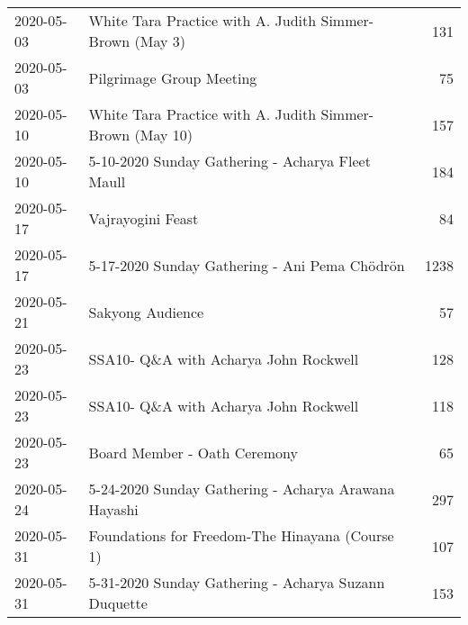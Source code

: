 \documentclass[
]{article}
\newenvironment{Shaded}{\begin{snugshade}}{\end{snugshade}}
\newcommand{\DataTypeTok}[1]{\textcolor[rgb]{0.13,0.29,0.53}{#1}}
\newcommand{\KeywordTok}[1]{\textcolor[rgb]{0.13,0.29,0.53}{\textbf{#1}}}
\newcommand{\NormalTok}[1]{#1}
\newcommand{\OperatorTok}[1]{\textcolor[rgb]{0.81,0.36,0.00}{\textbf{#1}}}
\newcommand{\OtherTok}[1]{\textcolor[rgb]{0.56,0.35,0.01}{#1}}
\newcommand{\StringTok}[1]{\textcolor[rgb]{0.31,0.60,0.02}{#1}}
\begin{document}
\begin{longtable}{llr}
2020-05-03 & White Tara Practice with A. Judith Simmer-Brown (May 3) & 131 \\ 
2020-05-03 & Pilgrimage Group Meeting & 75 \\ 
2020-05-10 & White Tara Practice with A. Judith Simmer-Brown (May 10) & 157 \\ 
2020-05-10 & 5-10-2020 Sunday Gathering - Acharya Fleet Maull & 184 \\ 
2020-05-17 & Vajrayogini Feast & 84 \\ 
2020-05-17 & 5-17-2020 Sunday Gathering - Ani Pema Chödrön & 1238 \\ 
2020-05-21 & Sakyong Audience & 57 \\ 
2020-05-23 & SSA10- Q\&A with Acharya John Rockwell & 128 \\ 
2020-05-23 & SSA10- Q\&A with Acharya John Rockwell & 118 \\ 
2020-05-23 & Board Member - Oath Ceremony & 65 \\ 
2020-05-24 & 5-24-2020 Sunday Gathering - Acharya Arawana Hayashi & 297 \\ 
2020-05-31 & Foundations for Freedom-The Hinayana (Course 1) & 107 \\ 
2020-05-31 & 5-31-2020 Sunday Gathering - Acharya Suzann Duquette & 153 \\ 
\bottomrule
\end{longtable}

\begin{Shaded}
\end{Shaded}

\begin{Shaded}
\end{Shaded}
\end{document}
